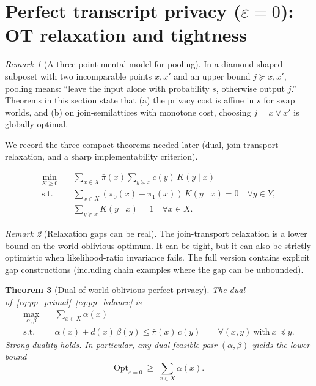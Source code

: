 \documentclass[11pt]{article}
\newtheorem{theorem}{Theorem}
\theoremstyle{definition}
\theoremstyle{remark}
\newtheorem{remark}[theorem]{Remark}
\begin{document}
\section[Perfect transcript privacy (epsilon=0)]{Perfect transcript privacy ($\varepsilon=0$): OT relaxation and tightness}

\begin{remark}[A three-point mental model for pooling]
In a diamond-shaped subposet with two incomparable points $x,x'$ and an upper bound $j\succeq x,x'$, pooling means:
``leave the input alone with probability $s$, otherwise output $j$.'' 
Theorems in this section state that (a) the privacy cost is affine in $s$ for swap worlds, and (b) on join-semilattices with monotone cost, choosing $j=x\vee x'$ is globally optimal.
\end{remark}

We record the three compact theorems needed later (dual, join-transport relaxation, and a sharp implementability criterion).

\begin{align}
\min_{K\ge 0}\quad &\sum_{x\in X}\bar\pi(x)\sum_{y\succeq x} c(y)\,K(y\mid x) \label{eq:pp_primal}\\
\text{s.t.}\quad &\sum_{x\in X}(\pi_0(x)-\pi_1(x))\,K(y\mid x)=0\quad \forall y\in Y, \label{eq:pp_balance}\\
&\sum_{y\succeq x}K(y\mid x)=1\quad \forall x\in X. \nonumber
\end{align}

\begin{remark}[Relaxation gaps can be real]
The join-transport relaxation is a lower bound on the world-oblivious optimum. It can be tight, but it can also be strictly optimistic when likelihood-ratio invariance fails.
The full version contains explicit gap constructions (including chain examples where the gap can be unbounded).
\end{remark}
\begin{theorem}[Dual of world-oblivious perfect privacy]\label{thm:pp_dual}
The dual of~\eqref{eq:pp_primal}--\eqref{eq:pp_balance} is
\begin{align}
\max_{\alpha,\beta}\quad & \sum_{x\in X}\alpha(x)\label{eq:pp_dual_obj}\\
\text{s.t.}\quad & \alpha(x)+d(x)\,\beta(y)\le \bar\pi(x)\,c(y)\qquad \forall (x,y)\ \text{with}\ x\preceq y.\label{eq:pp_dual_constr}
\end{align}
Strong duality holds. In particular, any dual-feasible pair \((\alpha,\beta)\) yields the lower bound
\[
\mathrm{Opt}_{\varepsilon=0}\ \ge\ \sum_{x\in X}\alpha(x).
\]
\end{theorem}
\end{document}
